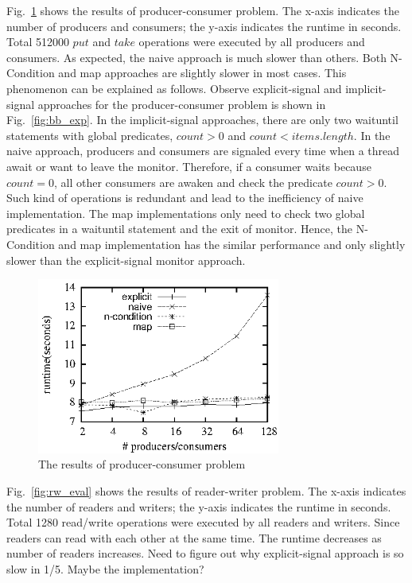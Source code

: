 \documentclass[10pt, conference, compsocconf]{IEEEtran}
\begin{document}
Fig.~\ref{fig:pc_eval} shows the results of producer-consumer problem. The
x-axis indicates the number of producers and consumers; the y-axis indicates the
runtime in seconds. Total 512000 $put$ and $take$ operations were executed by
all producers and consumers. As expected, the naive approach is much slower than
others. Both N-Condition and map approaches are slightly slower in most cases.
This phenomenon can be explained as follows. Observe explicit-signal and 
implicit-signal approaches for the producer-consumer problem is shown in 
Fig.~\ref{fig:bb_exp}. In the implicit-signal approaches, there are only two 
waituntil statements with global predicates, $count > 0$ and 
$count < items.length$. In the naive approach, producers and consumers are
signaled every time when a thread await or want to leave the monitor. Therefore,
if a consumer waits because $count = 0$, all other consumers are awaken and
check the predicate $count > 0$. Such kind of operations is redundant and lead
to the inefficiency of naive implementation. The map
implementations only need to check two global predicates in a waituntil
statement and the exit of monitor. Hence, the N-Condition and map implementation 
has the similar performance and only slightly slower than the explicit-signal
monitor approach. 
\begin{figure}[ht!]
  \centering
  \includegraphics[width=80mm]{fig/pc.eps}
  \caption{The results of producer-consumer problem}
  \label{fig:pc_eval}
\end{figure}

Fig.~\ref{fig:rw_eval} shows the results of reader-writer problem. The
x-axis indicates the number of readers and writers; the y-axis indicates the
runtime in seconds. Total 1280 read/write operations were executed by all
readers and writers. Since readers can read with each other at the same time.
The runtime decreases as number of readers increases. Need to figure out why 
explicit-signal approach is so slow in 1/5. Maybe the implementation? 
\end{document}
